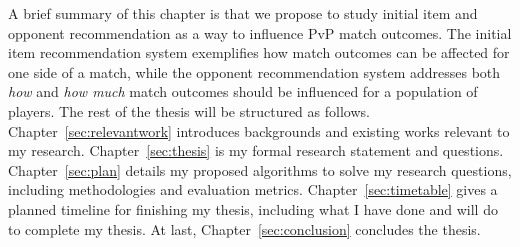 A brief summary of this chapter is that we propose to study initial item and opponent recommendation as a way to influence PvP match outcomes. The initial item recommendation system exemplifies how match outcomes can be affected for one side of a match, while the opponent recommendation system addresses both \textit{how} and \textit{how much} match outcomes should be influenced for a population of players. The rest of the thesis will be structured as follows. Chapter~\ref{sec:relevantwork} introduces backgrounds and existing works relevant to my research. Chapter~\ref{sec:thesis} is my formal research statement and questions. Chapter~\ref{sec:plan} details my proposed algorithms to solve my research questions, including methodologies and evaluation metrics. Chapter~\ref{sec:timetable} gives a planned timeline for finishing my thesis, including what I have done and will do to complete my thesis. At last, Chapter~\ref{sec:conclusion} concludes the thesis.


